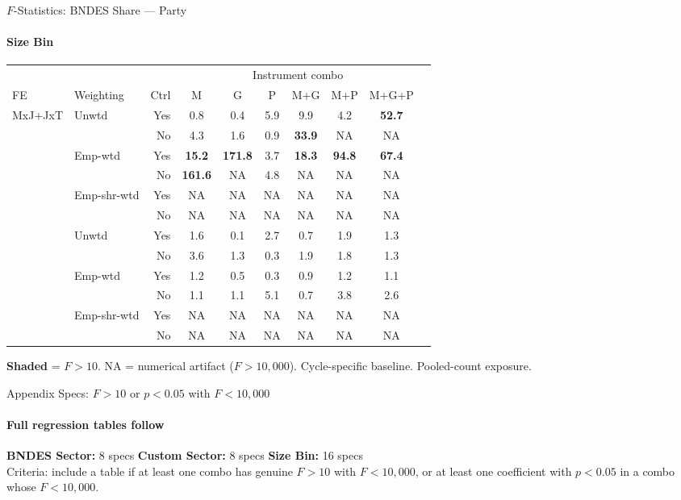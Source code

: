 \documentclass[aspectratio=169,10pt]{beamer}
\newcommand{\fpass}[1]{\cellcolor{pass}\textbf{#1}}
\begin{document}
\begin{frame}[t]{$F$-Statistics: BNDES Share --- Party}
\framesubtitle{Size Bin}
\begin{center}
\footnotesize
\setlength{\tabcolsep}{3.5pt}
\renewcommand{\arraystretch}{1.05}
\begin{tabular}{@{}llrccccccc@{}}
\toprule
 & & & \multicolumn{6}{c}{Instrument combo} \\
\cmidrule(l{2pt}r{2pt}){4-9}
FE & Weighting & Ctrl & M & G & P & M+G & M+P & M+G+P \\
\midrule
  \multirow{6}{*}{MxJ+JxT} & \multirow{2}{*}{Unwtd} & Yes & 0.8 & 0.4 & 5.9 & 9.9 & 4.2 & \fpass{52.7} \\
   &  & No & 4.3 & 1.6 & 0.9 & \fpass{33.9} & NA & NA \\
   & \multirow{2}{*}{Emp-wtd} & Yes & \fpass{15.2} & \fpass{171.8} & 3.7 & \fpass{18.3} & \fpass{94.8} & \fpass{67.4} \\
   &  & No & \fpass{161.6} & NA & 4.8 & NA & NA & NA \\
   & \multirow{2}{*}{Emp-shr-wtd} & Yes & NA & NA & NA & NA & NA & NA \\
   &  & No & NA & NA & NA & NA & NA & NA \\
\addlinespace[5pt]
  \multirow{6}{*}{MxJ+MxT} & \multirow{2}{*}{Unwtd} & Yes & 1.6 & 0.1 & 2.7 & 0.7 & 1.9 & 1.3 \\
   &  & No & 3.6 & 1.3 & 0.3 & 1.9 & 1.8 & 1.3 \\
   & \multirow{2}{*}{Emp-wtd} & Yes & 1.2 & 0.5 & 0.3 & 0.9 & 1.2 & 1.1 \\
   &  & No & 1.1 & 1.1 & 5.1 & 0.7 & 3.8 & 2.6 \\
   & \multirow{2}{*}{Emp-shr-wtd} & Yes & NA & NA & NA & NA & NA & NA \\
   &  & No & NA & NA & NA & NA & NA & NA \\
\bottomrule
\end{tabular}
\end{center}
{\scriptsize \colorbox{pass}{\textbf{Shaded}} = $F>10$. NA = numerical artifact ($F>10{,}000$). Cycle-specific baseline. Pooled-count exposure.}
\end{frame}


\begin{frame}[t]{Appendix Specs: $F>10$ or $p<0.05$ with $F<10{,}000$}
\framesubtitle{Full regression tables follow}
\begin{center}
\footnotesize
\textbf{BNDES Sector:} 8 specs \quad
\textbf{Custom Sector:} 8 specs \quad
\textbf{Size Bin:} 16 specs \quad
\\[1em]
{\scriptsize Criteria: include a table if at least one combo has genuine $F>10$ with $F<10{,}000$, or at least one coefficient with $p<0.05$ in a combo whose $F<10{,}000$.}
\end{center}
\end{frame}
\end{document}
